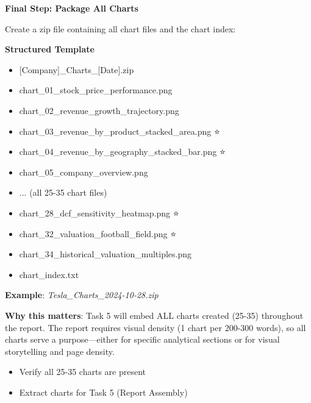 \documentclass[11pt]{article}
\begin{document}
\textbf{Final Step: Package All Charts}


Create a zip file containing all chart files and the chart index:


\textbf{Structured Template}
\begin{itemize}[leftmargin=*,itemsep=2pt,topsep=2pt]
\item {} [Company]\_\allowbreak{}Charts\_\allowbreak{}[Date].zip
\item {} chart\_\allowbreak{}01\_\allowbreak{}stock\_\allowbreak{}price\_\allowbreak{}performance.png
\item {} chart\_\allowbreak{}02\_\allowbreak{}revenue\_\allowbreak{}growth\_\allowbreak{}trajectory.png
\item {} chart\_\allowbreak{}03\_\allowbreak{}revenue\_\allowbreak{}by\_\allowbreak{}product\_\allowbreak{}stacked\_\allowbreak{}area.png ⭐
\item {} chart\_\allowbreak{}04\_\allowbreak{}revenue\_\allowbreak{}by\_\allowbreak{}geography\_\allowbreak{}stacked\_\allowbreak{}bar.png ⭐
\item {} chart\_\allowbreak{}05\_\allowbreak{}company\_\allowbreak{}overview.png
\item {} ... (all 25-35 chart files)
\item {} chart\_\allowbreak{}28\_\allowbreak{}dcf\_\allowbreak{}sensitivity\_\allowbreak{}heatmap.png ⭐
\item {} chart\_\allowbreak{}32\_\allowbreak{}valuation\_\allowbreak{}football\_\allowbreak{}field.png ⭐
\item {} chart\_\allowbreak{}34\_\allowbreak{}historical\_\allowbreak{}valuation\_\allowbreak{}multiples.png
\item {} chart\_\allowbreak{}index.txt
\end{itemize}

\textbf{Example}: \emph{Tesla\_\allowbreak{}Charts\_\allowbreak{}2024-10-28.zip}


\textbf{Why this matters}: Task 5 will embed ALL charts created (25-35) throughout the report. The report requires visual density (1 chart per 200-300 words), so all charts serve a purpose—either for specific analytical sections or for visual storytelling and page density.

\begin{itemize}[leftmargin=*,itemsep=2pt,topsep=2pt]
\item {} Verify all 25-35 charts are present
\item {} Extract charts for Task 5 (Report Assembly)
\end{itemize}
\end{document}
